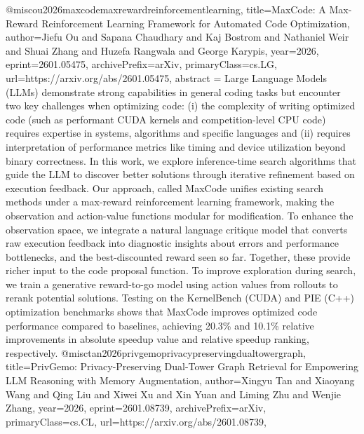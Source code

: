 {}@misc{ou2026maxcodemaxrewardreinforcementlearning,
      title={MaxCode: A Max-Reward Reinforcement Learning Framework for Automated Code Optimization}, 
      author={Jiefu Ou and Sapana Chaudhary and Kaj Bostrom and Nathaniel Weir and Shuai Zhang and Huzefa Rangwala and George Karypis},
      year={2026},
      eprint={2601.05475},
      archivePrefix={arXiv},
      primaryClass={cs.LG},
      url={https://arxiv.org/abs/2601.05475},
      abstract = {Large Language Models (LLMs) demonstrate strong capabilities in general coding tasks but encounter two key challenges when optimizing code: (i) the complexity of writing optimized code (such as performant CUDA kernels and competition-level CPU code) requires expertise in systems, algorithms and specific languages and (ii) requires interpretation of performance metrics like timing and device utilization beyond binary correctness. In this work, we explore inference-time search algorithms that guide the LLM to discover better solutions through iterative refinement based on execution feedback. Our approach, called MaxCode unifies existing search methods under a max-reward reinforcement learning framework, making the observation and action-value functions modular for modification. To enhance the observation space, we integrate a natural language critique model that converts raw execution feedback into diagnostic insights about errors and performance bottlenecks, and the best-discounted reward seen so far. Together, these provide richer input to the code proposal function. To improve exploration during search, we train a generative reward-to-go model using action values from rollouts to rerank potential solutions. Testing on the KernelBench (CUDA) and PIE (C++) optimization benchmarks shows that MaxCode improves optimized code performance compared to baselines, achieving 20.3\% and 10.1\% relative improvements in absolute speedup value and relative speedup ranking, respectively.}
}@misc{tan2026privgemoprivacypreservingdualtowergraph,
      title={PrivGemo: Privacy-Preserving Dual-Tower Graph Retrieval for Empowering LLM Reasoning with Memory Augmentation}, 
      author={Xingyu Tan and Xiaoyang Wang and Qing Liu and Xiwei Xu and Xin Yuan and Liming Zhu and Wenjie Zhang},
      year={2026},
      eprint={2601.08739},
      archivePrefix={arXiv},
      primaryClass={cs.CL},
      url={https://arxiv.org/abs/2601.08739},
}
